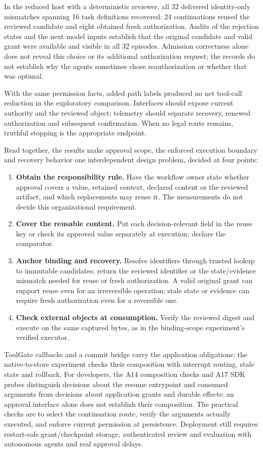 \documentclass[pdflatex,sn-basic]{sn-jnl}
\providecommand{\tightlist}{\setlength{\itemsep}{0pt}\setlength{\parskip}{0pt}}
\begin{document}
In the reduced host with a deterministic reviewer, all 32 delivered identity-only mismatches spanning 16 task definitions recovered: 24 continuations reused the reviewed candidate and eight obtained fresh authorization. Audits of the rejection states and the next model inputs establish that the original candidate and valid grant were available and visible in all 32 episodes. Admission correctness alone does not reveal this choice or its additional authorization request; the records do not establish why the agents sometimes chose reauthorization or whether that was optimal.

With the same permission facts, added path labels produced no net tool-call reduction in the exploratory comparison. Interfaces should expose current authority and the reviewed object; telemetry should separate recovery, renewed authorization and subsequent confirmation. When no legal route remains, truthful stopping is the appropriate endpoint.

Read together, the results make approval scope, the enforced execution boundary and recovery behavior one interdependent design problem, decided at four points:
\begin{enumerate}
\tightlist
\item \textbf{Obtain the responsibility rule.} Have the workflow owner state whether approval covers a value, retained context, declared content or the reviewed artifact, and which replacements may reuse it. The measurements do not decide this organizational requirement.
\item \textbf{Cover the reusable content.} Put each decision-relevant field in the reuse key or check its approved value separately at execution; declare the comparator.
\item \textbf{Anchor binding and recovery.} Resolve identifiers through trusted lookup to immutable candidates; return the reviewed identifier or the state/evidence mismatch needed for reuse or fresh authorization. A valid original grant can support reuse even for an irreversible operation; stale state or evidence can require fresh authorization even for a reversible one.
\item \textbf{Check external objects at consumption.} Verify the reviewed digest and execute on the same captured bytes, as in the binding-scope experiment's verified executor.
\end{enumerate}

ToolGate callbacks and a commit bridge carry the application obligations; the native-to-store experiment checks their composition with interrupt routing, stale state and rollback. For developers, the A14 composition checks and A17 SDK probes distinguish decisions about the resume entrypoint and consumed arguments from decisions about application grants and durable effects: an approval interface alone does not establish their composition. The practical checks are to select the continuation route, verify the arguments actually executed, and enforce current permission at persistence. Deployment still requires restart-safe grant/checkpoint storage, authenticated review and evaluation with autonomous agents and real approval delays.
\end{document}
